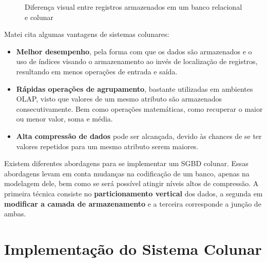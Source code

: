 \begin{figure}[htpb]
    \centering
    \caption{Diferença visual entre registros armazenados em um banco relacional e colunar}
    \label{fig:row-col}
\end{figure}

Matei \cite{matei2010column} cita algumas vantagens de sistemas colunares:

\begin{itemize}

    \item{\textbf{Melhor desempenho}}, pela forma com que os dados são armazenados e o uso de índices 
    visando o armazenamento ao invés de localização de registros, resultando em menos operações de 
    entrada e saída.
    \item{\textbf{Rápidas operações de agrupamento}}, bastante utilizadas em ambientes OLAP, visto 
    que valores de um mesmo atributo são armazenados consecutivamente. Bem como operações matemáticas, 
    como recuperar o maior ou menor valor, soma e média.
    \item{\textbf{Alta compressão de dados}} pode ser alcançada, devido às chances de se ter 
    valores repetidos para um mesmo atributo serem maiores.

\end{itemize}

Existem diferentes abordagens para se implementar um SGBD colunar. Essas abordagens levam em conta 
mudanças na codificação de um banco, apenas na modelagem dele, bem como se será possível atingir 
níveis altos de compressão. A primeira técnica consiste no \textbf{particionamento vertical} dos dados, a 
segunda em \textbf{modificar a camada de armazenamento} e a terceira corresponde a junção de ambas.

\section{Implementação do Sistema Colunar}
\label{sec:implementacao_col}

